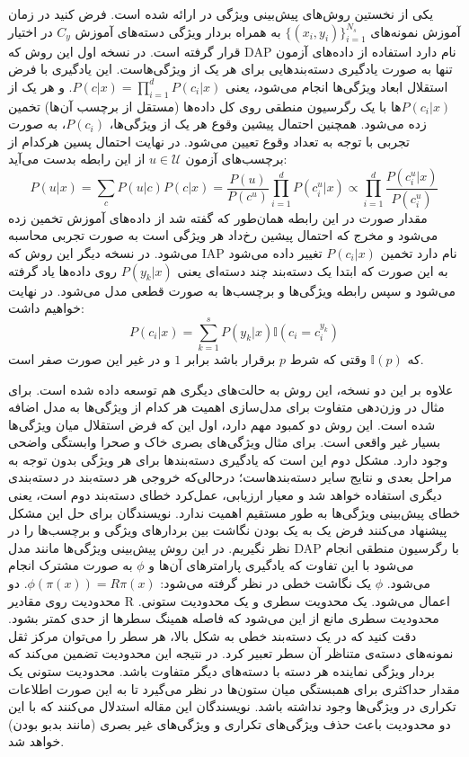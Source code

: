  
یکی از نخستین روش‌های پیش‌بینی ویژگی در \cite{lampert09} ارائه شده است. فرض کنید در زمان آموزش نمونه‌های 
$ \{ (x_i, y_i) \}_{i=1}^{N_s} $ 
به همراه بردار ویژگی دسته‌های آموزش  $C_y$ در اختیار قرار گرفته است. در نسخه اول این روش که DAP نام دارد استفاده از داده‌های آزمون تنها به صورت یادگیری دسته‌بندهایی برای هر یک از ویژگی‌هاست. این یادگیری با فرض استقلال ابعاد ویژگی‌ها انجام می‌شود، یعنی 
$P(c|x) = \prod_{i=1}^d P(c_i|x) $.
و هر یک از $P(c_i|x) $ها با یک رگرسیون منطقی 
روی کل داده‌ها (مستقل از برچسب آن‌ها) تخمین زده می‌شود. همچنین احتمال پیشین وقوع هر یک از ویژگی‌ها، $ P(c_i)$، به صورت تجربی
 با توجه به تعداد وقوع تعیین می‌شود. در نهایت احتمال پسین هرکدام از برچسب‌های آزمون $u \in \mathcal{U}$ از این رابطه بدست می‌آید:
\begin{equation}
P(u | x ) = \sum_{c} P(u | c)P(c|x) = \frac{P(u)}{P(c^u)} \prod_{i=1}^d P(c^u_i|x) \propto \prod_{i=1}^d \frac{P(c^u_i|x)}{P(c^u_i)}
\end{equation}
مقدار صورت در این رابطه همان‌طور که گفته شد از داده‌های آموزش تخمین زده می‌شود و مخرج که احتمال پیشین رخ‌داد هر ویژگی است به صورت تجربی محاسبه می‌شود.
در نسخه دیگر این روش که IAP نام دارد تخمین  $P(c_i|x) $ تغییر داده می‌شود به این صورت که ابتدا یک دسته‌بند چند دسته‌ای یعنی $P(y_k |x)$ روی داده‌ها یاد گرفته می‌شود و سپس رابطه ویژگی‌ها و برچسب‌ها به صورت قطعی مدل می‌شود. در نهایت خواهیم داشت:
\begin{equation}
P(c_i | x) = \sum_{k=1}^s P(y_k | x) \mathbb{I}(c_i = c^{y_k}_i)
\end{equation}
که $ \mathbb{I}(p) $ وقتی که شرط $p$ برقرار باشد برابر $1$ و در غیر این صورت صفر است. 

علاوه بر این دو نسخه، این روش به حالت‌های دیگری هم توسعه داده شده است. برای مثال در \cite{suzuki14} وزن‌دهی متفاوت برای مدل‌سازی اهمیت هر کدام از ویژگی‌ها به مدل اضافه شده است. این روش دو کمبود مهم دارد، اول این که فرض استقلال میان ویژگی‌ها بسیار غیر واقعی است. برای مثال ویژگی‌های بصری خاک و صحرا وابستگی واضحی وجود دارد. مشکل دوم این است که  یادگیری دسته‌بندها برای هر ویژگی بدون توجه به مراحل بعدی و نتایج سایر دسته‌‌بندهاست؛ درحالی‌که خروجی هر دسته‌بند در دسته‌بندی دیگری استفاده خواهد شد و معیار ارزیابی،  عمل‌کرد خطای دسته‌بند دوم است، یعنی خطای پیش‌بینی ویژگی‌ها به طور مستقیم اهمیت ندارد. نویسندگان \cite{ ajoint11} برای حل این مشکل پیشنهاد می‌کنند فرض یک به یک بودن نگاشت بین بردارهای ویژگی و برچسب‌ها را در نظر نگیریم. در این روش پیش‌بینی ویژگی‌ها مانند مدل DAP با رگرسیون منطقی انجام می‌شود با این تفاوت که یادگیری پارامترهای آن‌ها و  $\phi$ به صورت مشترک انجام می‌شود. $\phi$ یک نگاشت خطی در نظر گرفته می‌شود: 
  $\phi(\pi(x)) = R\pi(x) $. 
 دو محدودیت روی مقادیر R اعمال می‌شود. یک محدویت سطری و یک محدودیت ستونی. محدودیت سطری مانع از این می‌شود که فاصله همینگ سطرها از حدی کمتر بشود. دقت کنید که در یک دسته‌بند خطی به شکل بالا، هر سطر را می‌توان مرکز ثقل نمونه‌های دسته‌ی متناظر آن سطر تعبیر کرد. در نتیجه این محدودیت تضمین می‌کند که بردار ویژگی نماینده هر دسته با دسته‌های دیگر متفاوت باشد. محدودیت ستونی یک مقدار حداکثری برای همبستگی میان ستون‌ها در نظر می‌گیرد تا به این صورت اطلاعات تکراری در ویژگی‌ها وجود نداشته باشد. نویسندگان این مقاله استدلال می‌کنند که با این دو محدودیت باعث حذف ویژگی‌های تکراری و ویژگی‌های غیر بصری (مانند بدبو بودن) خواهد شد.
 
